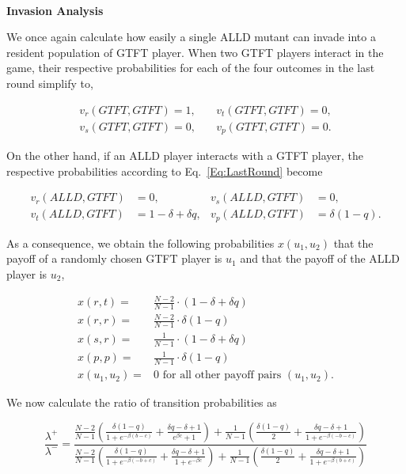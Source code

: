 \documentclass[11pt]{article}
\theoremstyle{plainCl1}
\theoremstyle{plainCl2}
\begin{document}
~\\
{\bf Invasion Analysis}

We once again calculate how easily a single ALLD mutant can invade into a
resident population of GTFT player. When two GTFT players interact in the game,
their respective probabilities for each of the four outcomes in the last round
simplify to,

\begin{align*}
    v_{r}(GTFT,GTFT) = 1, & \quad v_{t}(GTFT,GTFT) = 0, \\
    v_{s}(GTFT,GTFT) = 0, & \quad v_{p}(GTFT,GTFT) = 0.
\end{align*}

On the other hand, if an ALLD player interacts with a GTFT player, the
respective probabilities according to Eq.~\ref{Eq:LastRound} become

\begin{align*}
    v_{r}(ALLD,GTFT) & = 0, &  v_{s}(ALLD,GTFT) & = 0, \\
    v_{t} (ALLD, GTFT ) & = 1 - \delta + \delta q, &  v_{p} (ALLD, GTFT) & = \delta(1 - q).
\end{align*}

As a consequence, we obtain the following probabilities \(x(u_1, u_2)\) that the
payoff of a randomly chosen GTFT player is \(u_1\) and that the payoff of the
ALLD player is \(u_2\),

\begin{align*}
  x(r, t) = & \frac{N - 2}{N - 1} \cdot (1 - \delta + \delta q)\\
  x(r, r) = & \frac{N - 2}{N - 1} \cdot \delta (1 - q) \\
  x(s, r) = & \frac{1}{N - 1} \cdot (1 - \delta + \delta q) \\
  x(p, p) = & \frac{1}{N - 1} \cdot \delta (1 - q) \\
  x(u_1, u_2) = &  0 \text{ for all other payoff pairs } (u_1, u_2).
\end{align*}

We now calculate the ratio of transition probabilities as

\begin{equation*}
\frac{\lambda^{+}}{\lambda^{-}} = \frac{ \frac{N - 2}{N - 1}  \left( \frac{ \delta  \left(1 - q \right)}{1
+ e^{-  \beta  \left(b - c \right)}} +  \frac{ \delta q -  \delta + 1}{e^{ \beta
c} + 1} \right)  +  \frac{1}{N-1}  \left(\frac{ \delta  \left(1 - q \right)}{2} +
 \frac{ \delta q -  \delta + 1}{1 + e^{-  \beta  \left(- b - c \right)}}\right)}
 { \frac{N - 2}{N - 1}  \left( \frac{ \delta  \left(1 - q \right)}{1 +
e^{-  \beta  \left(- b + c \right)}} +  \frac{ \delta q -  \delta + 1}{1 + e^{-
 \beta c}} \right) +  \frac{1}{N -1} \left(\frac{ \delta  \left(1 - q \right)}{2} +
 \frac{ \delta q -  \delta + 1}{1 + e^{-  \beta  \left(b + c \right)}}\right)}
\end{equation*}
\end{document}
